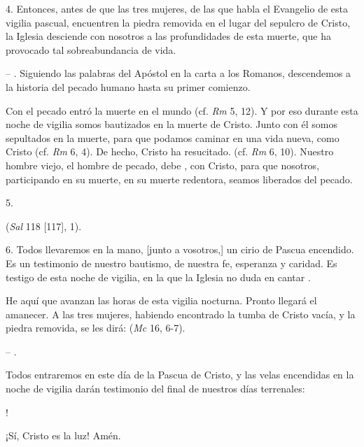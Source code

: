 \begin{body}
4. Entonces, antes de que las tres mujeres, de las que habla el Evangelio de esta vigilia pascual, encuentren la piedra removida en el lugar del sepulcro de Cristo, la Iglesia desciende con nosotros a las profundidades de esta muerte, que ha provocado tal sobreabundancia de vida. 

 – . Siguiendo las palabras del Apóstol en la carta a los Romanos, descendemos a la historia del pecado humano hasta su primer comienzo. 

Con el pecado entró la muerte en el mundo (cf. \textit{Rm} 5, 12). Y por eso durante esta noche de vigilia somos bautizados en la muerte de Cristo. Junto con él somos sepultados en la muerte, para que podamos caminar en una vida nueva, como Cristo (cf. \textit{Rm} 6, 4). De hecho, Cristo ha resucitado.  (cf. \textit{Rm} 6, 10). Nuestro hombre viejo, el hombre de pecado, debe , con Cristo, para que nosotros, participando en su muerte, en su muerte redentora, seamos liberados del pecado. 

5. 

 (\textit{Sal} 118 [117], 1). 

6. Todos llevaremos en la mano, [junto a vosotros,] un cirio de Pascua encendido. Es un testimonio de nuestro bautismo, de nuestra fe, esperanza y caridad. Es testigo de esta noche de vigilia, en la que la Iglesia no duda en cantar . 

He aquí que avanzan las horas de esta vigilia nocturna. Pronto llegará el amanecer. A las tres mujeres, habiendo encontrado la tumba de Cristo vacía, y la piedra removida, se les dirá:  (\textit{Mc} 16, 6-7). 

 – . 

Todos entraremos en este día de la Pascua de Cristo, y las velas encendidas en la noche de vigilia darán testimonio del final de nuestros días terrenales: 

! 

¡Sí, Cristo es la luz! Amén.
\end{body}

